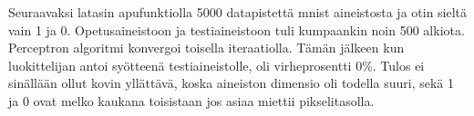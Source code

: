 \documentclass[a4paper,10pt]{article}
\begin{document}
Seuraavaksi latasin apufunktiolla 5000 datapistettä mnist aineistosta ja otin sieltä vain 1 ja 0.
Opetusaineistoon ja testiaineistoon tuli kumpaankin noin 500 alkiota. Perceptron algoritmi konvergoi toisella iteraatiolla. Tämän jälkeen kun luokittelijan
antoi syötteenä testiaineistolle, oli virheprosentti 0\%.
Tulos ei sinällään ollut kovin yllättävä, koska aineiston dimensio oli todella suuri, sekä 1 ja 0 ovat melko kaukana toisistaan jos asiaa miettii 
pikselitasolla. 
\end{document}

